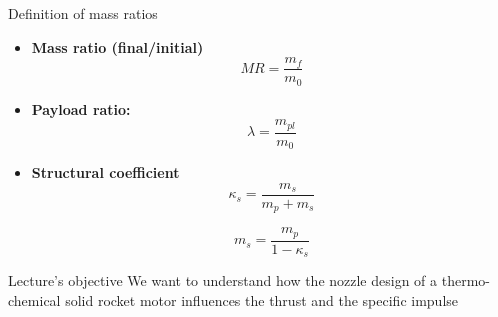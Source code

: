\documentclass[
  ignorenonframetext,
]{beamer}
\begin{document}
\begin{frame}{Definition of mass ratios}
\protect\hypertarget{definition-of-mass-ratios}{}
\begin{itemize}
\item
  \textbf{Mass ratio (final/initial)} \[MR = \frac{m_f}{m_0}\]
\item
  \textbf{Payload ratio:} \[\lambda = \frac{m_{pl}}{m_0}\]
\item
  \textbf{Structural coefficient} \[\kappa_s = \frac{m_s}{m_p + m_s}\]

  \[m_s = \frac{m_p}{1 - \kappa_s}\]
\end{itemize}
\end{frame}

\begin{frame}{Lecture's objective}
\protect\hypertarget{lectures-objective}{}
We want to understand how the nozzle design of a thermo-chemical solid
rocket motor influences the thrust and the specific impulse
\end{frame}
\end{document}

